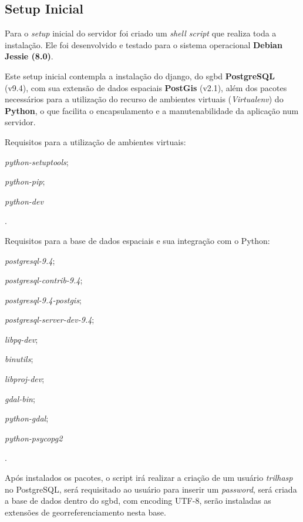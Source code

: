 \subsection{Setup Inicial}
Para o \textit{setup} inicial do servidor foi criado um \textit{shell script} que realiza toda a instalação. Ele foi desenvolvido e testado para o sistema operacional \textbf{Debian Jessie (8.0)}.

Este setup inicial contempla a instalação do \gls{django}, do \gls{sgbd} \textbf{PostgreSQL} (v9.4), com sua extensão de dados espaciais \textbf{PostGis} (v2.1), além dos pacotes necessários para a utilização do recurso de ambientes virtuais (\textit{Virtualenv}) do \textbf{Python}, o que facilita o encapsulamento e a manutenabilidade da aplicação num servidor.

Requisitos para a utilização de ambientes virtuais: %
\begin{enumerate*}[label=\itshape\alph*\upshape)] 
    \item \mbox{\textit{python-setuptools}};
    \item \mbox{\textit{python-pip}};
    \item \mbox{\textit{python-dev}}
\end{enumerate*}.

Requisitos para a base de dados espaciais e sua integração com o Python: %
\begin{enumerate*}[label=\itshape\alph*\upshape)]
    \item\mbox{\textit{postgresql-9.4}};
    \item\mbox{\textit{postgresql-contrib-9.4}};
    \item\mbox{\textit{postgresql-9.4-postgis}};
    \item\mbox{\textit{postgresql-server-dev-9.4}};
    \item\mbox{\textit{libpq-dev}};
    \item\mbox{\textit{binutils}};
    \item\mbox{\textit{libproj-dev}};
    \item\mbox{\textit{gdal-bin}};
    \item\mbox{\textit{python-gdal}};
    \item\mbox{\textit{python-psycopg2}}
\end{enumerate*}.

Após instalados os pacotes, o script irá realizar a criação de um usuário \textit{trilhasp} no PostgreSQL, será requisitado ao usuário para inserir um \textit{password}, será criada a base de dados dentro do \gls{sgbd}, com encoding UTF-8, serão instaladas as extensões de georreferenciamento nesta base.

